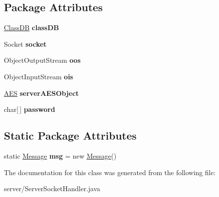 \subsection*{\-Package \-Attributes}
\begin{DoxyCompactItemize}
\item 
\hypertarget{classserver_1_1_server_socket_handler_aecd970b9a55a38d63a65b484d4398d26}{
\hyperlink{classstorage_1_1_class_d_b}{\-Class\-D\-B} {\bfseries class\-D\-B}}
\label{classserver_1_1_server_socket_handler_aecd970b9a55a38d63a65b484d4398d26}

\item 
\hypertarget{classserver_1_1_server_socket_handler_ac5b38a39023dd4955cdd66499762718f}{
\-Socket {\bfseries socket}}
\label{classserver_1_1_server_socket_handler_ac5b38a39023dd4955cdd66499762718f}

\item 
\hypertarget{classserver_1_1_server_socket_handler_a82157ec4091c8a5b07112edd59ec8d1b}{
\-Object\-Output\-Stream {\bfseries oos}}
\label{classserver_1_1_server_socket_handler_a82157ec4091c8a5b07112edd59ec8d1b}

\item 
\hypertarget{classserver_1_1_server_socket_handler_a7dfb87e97d982ec56fd251ca94c1a27b}{
\-Object\-Input\-Stream {\bfseries ois}}
\label{classserver_1_1_server_socket_handler_a7dfb87e97d982ec56fd251ca94c1a27b}

\item 
\hypertarget{classserver_1_1_server_socket_handler_aec8b5bc5c9b907a530585c29d060ab1d}{
\hyperlink{classsecurity_1_1_a_e_s}{\-A\-E\-S} {\bfseries server\-A\-E\-S\-Object}}
\label{classserver_1_1_server_socket_handler_aec8b5bc5c9b907a530585c29d060ab1d}

\item 
\hypertarget{classserver_1_1_server_socket_handler_a649ae68e970b82b8aa56b2c357757931}{
char\mbox{[}$\,$\mbox{]} {\bfseries password}}
\label{classserver_1_1_server_socket_handler_a649ae68e970b82b8aa56b2c357757931}

\end{DoxyCompactItemize}
\subsection*{\-Static \-Package \-Attributes}
\begin{DoxyCompactItemize}
\item 
\hypertarget{classserver_1_1_server_socket_handler_a87794d1556cbec5e8a862375ed83f0e7}{
static \hyperlink{classstorage_1_1_message}{\-Message} {\bfseries msg} = new \hyperlink{classstorage_1_1_message}{\-Message}()}
\label{classserver_1_1_server_socket_handler_a87794d1556cbec5e8a862375ed83f0e7}

\end{DoxyCompactItemize}


\-The documentation for this class was generated from the following file\-:\begin{DoxyCompactItemize}
\item 
server/\-Server\-Socket\-Handler.\-java\end{DoxyCompactItemize}
